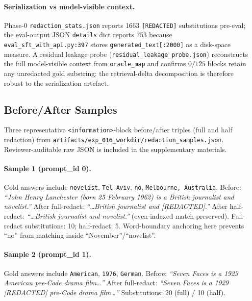 \paragraph{Serialization vs model-visible context.}
Phase-0 \texttt{redaction\_stats.json} reports 1663 \texttt{[REDACTED]} substitutions pre-eval; the eval-output JSON \texttt{details} dict reports 753 because \texttt{eval\_sft\_with\_api.py:397} stores \texttt{generated\_text[:2000]} as a disk-space measure. A residual leakage probe (\texttt{residual\_leakage\_probe.json}) reconstructs the full model-visible context from \texttt{oracle\_map} and confirms $0/125$ blocks retain any unredacted gold substring; the retrieval-delta decomposition is therefore robust to the serialization artefact.

\subsection{Before/After Samples}
\label{app:redaction_samples}

Three representative \texttt{<information>}-block before/after triples (full and half redaction) from \texttt{artifacts/exp\_016\_workdir/redaction\_samples.json}. Reviewer-auditable raw JSON is included in the supplementary materials.

\paragraph{Sample 1 (prompt\_id 0).} Gold answers include \texttt{novelist}, \texttt{Tel Aviv}, \texttt{no}, \texttt{Melbourne, Australia}. Before: \emph{``John Henry Lanchester (born 25 February 1962) is a British journalist and novelist.''} After full-redact: \emph{``\ldots British journalist and [REDACTED].''} After half-redact: \emph{``\ldots British journalist and novelist.''} (even-indexed match preserved). Full-redact substitutions: 10; half-redact: 5. Word-boundary anchoring here prevents ``no'' from matching inside ``November''/``novelist''.

\paragraph{Sample 2 (prompt\_id 1).} Gold answers include \texttt{American}, \texttt{1976}, \texttt{German}. Before: \emph{``Seven Faces is a 1929 American pre-Code drama film\ldots''} After full-redact: \emph{``Seven Faces is a 1929 [REDACTED] pre-Code drama film\ldots''} Substitutions: 20 (full) / 10 (half).

